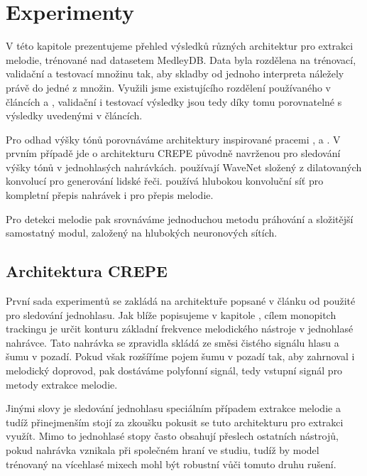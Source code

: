 \chapter{Experimenty}

V této kapitole prezentujeme přehled výsledků různých architektur pro extrakci melodie, trénované nad datasetem MedleyDB. Data byla rozdělena na trénovací, validační a testovací množinu tak, aby skladby od jednoho interpreta náležely právě do jedné z množin. Využili jsme existujícího rozdělení používaného v článcích \cite{Bittner2017} a \cite{DBasaranSEssid2018}, validační i testovací výsledky jsou tedy díky tomu porovnatelné s výsledky uvedenými v článcích.

Pro odhad výšky tónů porovnáváme architektury inspirované pracemi \cite{Kim2018}, \cite{Oord2016} a \cite{Bittner2017}. V prvním případě jde o architekturu CREPE původně navrženou pro sledování výšky tónů v jednohlasých nahrávkách. \cite{Oord2016} používají WaveNet složený z dilatovaných konvolucí pro generování lidské řeči. \cite{Bittner2017} používá hlubokou konvoluční síť pro kompletní přepis nahrávek i pro přepis melodie. 

Pro detekci melodie pak srovnáváme jednoduchou metodu práhování a složitější samostatný modul, založený na hlubokých neuronových sítích.

\section{Architektura CREPE}\label{sec:crepe}

První sada experimentů se zakládá na architektuře popsané v článku od \cite{Kim2018} použité pro sledování jednohlasu. Jak blíže popisujeme v kapitole , cílem monopitch trackingu je určit konturu základní frekvence melodického nástroje v jednohlasé nahrávce. Tato nahrávka se zpravidla skládá ze směsi čistého signálu hlasu a šumu v pozadí. Pokud však rozšíříme pojem šumu v pozadí tak, aby zahrnoval i melodický doprovod, pak dostáváme polyfonní signál, tedy vstupní signál pro metody extrakce melodie.

Jinými slovy je sledování jednohlasu speciálním případem extrakce melodie a tudíž přinejmenším stojí za zkoušku pokusit se tuto architekturu pro extrakci využít. Mimo to jednohlasé stopy často obsahují přeslech ostatních nástrojů, pokud nahrávka vznikala při společném hraní ve studiu, tudíž by model trénovaný na vícehlasé mixech mohl být robustní vůči tomuto druhu rušení. 

